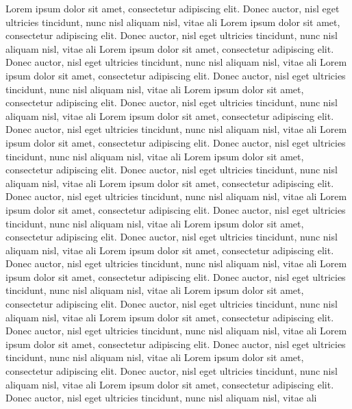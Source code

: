 	Lorem ipsum dolor sit amet, consectetur adipiscing elit. Donec auctor, nisl eget ultricies tincidunt, nunc nisl aliquam nisl, vitae ali Lorem ipsum dolor sit amet, consectetur adipiscing elit. Donec auctor, nisl eget ultricies tincidunt, nunc nisl aliquam nisl, vitae ali Lorem ipsum dolor sit amet, consectetur adipiscing elit. Donec auctor, nisl eget ultricies tincidunt, nunc nisl aliquam nisl, vitae ali Lorem ipsum dolor sit amet, consectetur adipiscing elit. Donec auctor, nisl eget ultricies tincidunt, nunc nisl aliquam nisl, vitae ali Lorem ipsum dolor sit amet, consectetur adipiscing elit. Donec auctor, nisl eget ultricies tincidunt, nunc nisl aliquam nisl, vitae ali Lorem ipsum dolor sit amet, consectetur adipiscing elit. Donec auctor, nisl eget ultricies tincidunt, nunc nisl aliquam nisl, vitae ali Lorem ipsum dolor sit amet, consectetur adipiscing elit. Donec auctor, nisl eget ultricies tincidunt, nunc nisl aliquam nisl, vitae ali Lorem ipsum dolor sit amet, consectetur adipiscing elit. Donec auctor, nisl eget ultricies tincidunt, nunc nisl aliquam nisl, vitae ali Lorem ipsum dolor sit amet, consectetur adipiscing elit. Donec auctor, nisl eget ultricies tincidunt, nunc nisl aliquam nisl, vitae ali Lorem ipsum dolor sit amet, consectetur adipiscing elit. Donec auctor, nisl eget ultricies tincidunt, nunc nisl aliquam nisl, vitae ali Lorem ipsum dolor sit amet, consectetur adipiscing elit. Donec auctor, nisl eget ultricies tincidunt, nunc nisl aliquam nisl, vitae ali Lorem ipsum dolor sit amet, consectetur adipiscing elit. Donec auctor, nisl eget ultricies tincidunt, nunc nisl aliquam nisl, vitae ali Lorem ipsum dolor sit amet, consectetur adipiscing elit. Donec auctor, nisl eget ultricies tincidunt, nunc nisl aliquam nisl, vitae ali Lorem ipsum dolor sit amet, consectetur adipiscing elit. Donec auctor, nisl eget ultricies tincidunt, nunc nisl aliquam nisl, vitae ali Lorem ipsum dolor sit amet, consectetur adipiscing elit. Donec auctor, nisl eget ultricies tincidunt, nunc nisl aliquam nisl, vitae ali Lorem ipsum dolor sit amet, consectetur adipiscing elit. Donec auctor, nisl eget ultricies tincidunt, nunc nisl aliquam nisl, vitae ali Lorem ipsum dolor sit amet, consectetur adipiscing elit. Donec auctor, nisl eget ultricies tincidunt, nunc nisl aliquam nisl, vitae ali Lorem ipsum dolor sit amet, consectetur adipiscing elit. Donec auctor, nisl eget ultricies tincidunt, nunc nisl aliquam nisl, vitae ali 